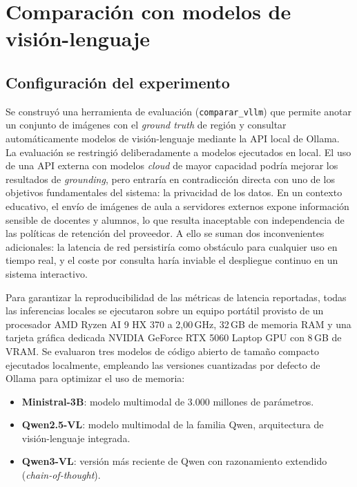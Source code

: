 \documentclass[12pt]{report} %
\begin{document}
\section{Comparación con modelos de visión-lenguaje}
\label{sec:eval_vllm}

\subsection{Configuración del experimento}

Se construyó una herramienta de evaluación (\texttt{comparar\_vllm}) que permite anotar un conjunto de imágenes con el \textit{ground truth} de región y consultar automáticamente modelos de visión-lenguaje mediante la API local de Ollama. La evaluación se restringió deliberadamente a modelos ejecutados en local. El uso de una API externa con modelos \textit{cloud} de mayor capacidad podría mejorar los resultados de \textit{grounding}, pero entraría en contradicción directa con uno de los objetivos fundamentales del sistema: la privacidad de los datos. En un contexto educativo, el envío de imágenes de aula a servidores externos expone información sensible de docentes y alumnos, lo que resulta inaceptable con independencia de las políticas de retención del proveedor. A ello se suman dos inconvenientes adicionales: la latencia de red persistiría como obstáculo para cualquier uso en tiempo real, y el coste por consulta haría inviable el despliegue continuo en un sistema interactivo. 

Para garantizar la reproducibilidad de las métricas de latencia reportadas, todas las inferencias locales se ejecutaron sobre un equipo portátil provisto de un procesador AMD Ryzen AI 9 HX 370 a 2,00\,GHz, 32\,GB de memoria RAM y una tarjeta gráfica dedicada NVIDIA GeForce RTX 5060 Laptop GPU con 8\,GB de VRAM. Se evaluaron tres modelos de código abierto de tamaño compacto ejecutados localmente, empleando las versiones cuantizadas por defecto de Ollama para optimizar el uso de memoria:

\begin{itemize}
  \item \textbf{Ministral-3B}: modelo multimodal de 3.000 millones de parámetros.
  \item \textbf{Qwen2.5-VL}: modelo multimodal de la familia Qwen, arquitectura de visión-lenguaje integrada.
  \item \textbf{Qwen3-VL}: versión más reciente de Qwen con razonamiento extendido (\textit{chain-of-thought}).
\end{itemize}
\end{document}
